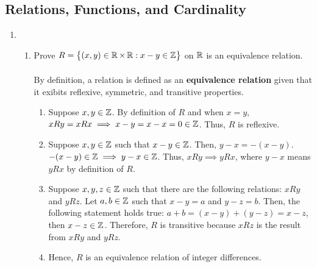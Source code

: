 \subsection*{Relations, Functions, and Cardinality}
\begin{enumerate}
    \item
          \begin{enumerate}[label=(\alph*), itemsep=10pt]
              \item Prove $R = \bigl\{ {(x,y) \in \operatorname{\mathbb{R}} \times \operatorname{\mathbb{R}} : x - y \in \operatorname{\mathbb{Z}}} \bigr\}$ on $\operatorname{\mathbb{R}}$ is an equivalence relation. \\\\
                    By definition, a relation is defined as an \textbf{equivalence relation} given that it exibits reflexive, symmetric, and transitive properties.
                    \begin{enumerate}
                        \item Suppose $x,y \in \operatorname{\mathbb{Z}}$. By definition of $R$ and when $x=y$, $xRy = xRx \implies x - y = x - x = 0 \in \operatorname{\mathbb{Z}}$. Thus, $R$ is reflexive.
                        \item Suppose $x,y \in \operatorname{\mathbb{Z}}$ such that $x - y \in \operatorname{\mathbb{Z}}$. Then, $y - x = -(x - y)$. $-(x - y) \in \operatorname{\mathbb{Z}} \implies y - x \in \operatorname{\mathbb{Z}}$. Thus, $xRy \implies yRx$, where $y - x$ means $yRx$ by definition of $R$.
                        \item Suppose $x,y,z \in \operatorname{\mathbb{Z}}$ such that there are the following relations: $xRy$ and $yRz$. Let $a,b \in \operatorname{\mathbb{Z}}$ such that $x - y = a$ and $y - z = b$. Then, the following statement holds true: $a + b = (x - y) + (y - z) = x - z$, then $x - z \in \operatorname{\mathbb{Z}}$. Therefore, $R$ is transitive because $xRz$ is the result from $xRy$ and $yRz$.
                        \item Hence, $R$ is an equivalence relation of integer differences.
                    \end{enumerate}


\end{enumerate}
\end{enumerate}
